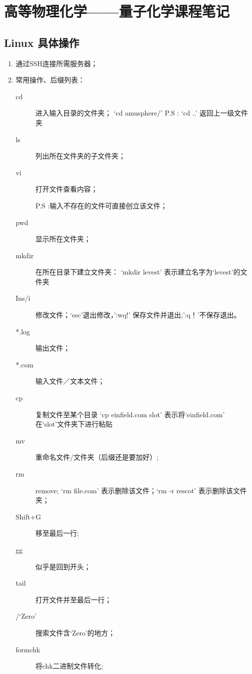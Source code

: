 \chapter{高等物理化学——量子化学课程笔记}
\section{Linux 具体操作}
\begin{enumerate}
	\item 通过SSH连接所需服务器；
	\item 常用操作、后缀列表：
	\begin{description}
		\item[cd]
			进入输入目录的文件夹；
			`cd amusphere/'
			P.S : `cd ..' 返回上一级文件夹
		\item[ls]
			列出所在文件夹的子文件夹；

		\item[vi]
			打开文件查看内容；

			P.S :输入不存在的文件可直接创立该文件；
		\item[pwd]
			显示所在文件夹；

		\item[mkdir]
			在所在目录下建立文件夹：
			`mkdir levest' 表示建立名字为`levest'的文件夹

		\item[Ins/i]修改文件；`esc'退出修改，':wq!' 保存文件并退出;':q！’不保存退出。
		
		\item[*.log]
			输出文件；

		\item[*.com]
			输入文件／文本文件；

		\item[cp] 复制文件至某个目录
			`cp einfield.com slot' 表示将`einfield.com' 在`slot'文件夹下进行粘贴

		\item[mv] 重命名文件/文件夹（后缀还是要加好）;

		\item[rm] remove; `rm file.com' 表示删除该文件；`rm -r rescot' 表示删除该文件夹；

		\item[Shift+G] 移至最后一行;

		\item[gg] 似乎是回到开头；

		\item[tail] 打开文件并至最后一行；

		\item[/`Zero'] 搜索文件含`Zero'的地方；

		\item[formchk] 将chk二进制文件转化;
	\end{description}

\end{enumerate}


